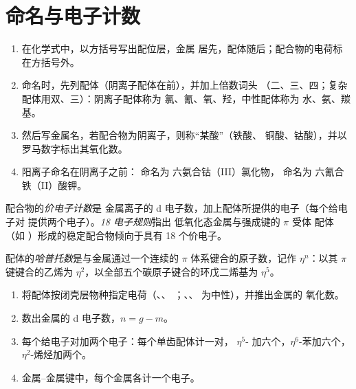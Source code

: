 \section{命名与电子计数}

\begin{method}[配合物的命名]\label{met:b2:coordination-complexes:naming}
\begin{enumerate}
  \item 在化学式中，以方括号写出配位层，金属
        居先，配体随后；配合物的电荷标在方括号外。
  \item 命名时，先列配体（阴离子配体在前），并加上倍数词头
        （二、三、四；复杂配体用双、三）：阴离子配体称为
        氯、氰、氧、羟，中性配体称为
        水、氨、羰基。
  \item 然后写金属名，若配合物为阴离子，则称“某酸”（铁酸、
        铜酸、钴酸），并以罗马数字标出其氧化数。
  \item 阳离子命名在阴离子之前： 命名为
        六氨合钴（III）氯化物， 命名为
        六氰合铁（II）酸钾。
\end{enumerate}
\end{method}

\begin{definition}[电子计数]\label{def:b2:coordination-complexes:electron-count}
配合物的\emph{价电子计数}是
金属离子的 d 电子数，加上配体所提供的电子（每个给电子对
提供两个电子）。\emph{18 电子规则}指出
低氧化态金属与强成键的 $\pi$ 受体
配体（如 ）形成的稳定配合物倾向于具有 18 个价电子。
\end{definition}

\begin{definition}[哈普托数]\label{def:b2:coordination-complexes:hapticity}
配体的\emph{哈普托数}是与金属通过一个连续的
$\pi$ 体系键合的原子数，记作 $\eta^n$：以其 $\pi$ 键键合的乙烯为
$\eta^2$，以全部五个碳原子键合的环戊二烯基为 $\eta^5$。
\end{definition}

\begin{method}[电子计数]\label{met:b2:coordination-complexes:electron-count}
\begin{enumerate}
  \item 将配体按闭壳层物种指定电荷（、、
        ；、、 为中性），并推出金属的
        氧化数。
  \item 数出金属的 d 电子数，$n = g - m$。
  \item 每个给电子对加两个电子：每个单齿配体计一对，
        $\eta^5$- 加六个，$\eta^6$-苯加六个，$\eta^2$-烯烃加两个。
  \item 金属–金属键中，每个金属各计一个电子。
\end{enumerate}
\end{method}


